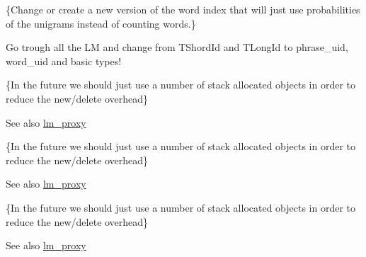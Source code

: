 \begin{DoxyRefList}
\item[\label{todo__todo000005}%
\hypertarget{todo__todo000005}{}%
Class \hyperlink{classuva_1_1smt_1_1bpbd_1_1server_1_1lm_1_1dictionary_1_1counting__word__index}{uva\+:\+:smt\+:\+:bpbd\+:\+:server\+:\+:lm\+:\+:dictionary\+:\+:counting\+\_\+word\+\_\+index} ]\{Change or create a new version of the word index that will just use probabilities of the unigrams instead of counting words.\}  
\item[\label{todo__todo000006}%
\hypertarget{todo__todo000006}{}%
Namespace \hyperlink{namespaceuva_1_1smt_1_1bpbd_1_1server_1_1lm_1_1identifiers}{uva\+:\+:smt\+:\+:bpbd\+:\+:server\+:\+:lm\+:\+:identifiers} ]Go trough all the L\+M and change from T\+Shord\+Id and T\+Long\+Id to phrase\+\_\+uid, word\+\_\+uid and basic types!  
\item[\label{todo__todo000007}%
\hypertarget{todo__todo000007}{}%
Member \hyperlink{classuva_1_1smt_1_1bpbd_1_1server_1_1lm_1_1proxy_1_1lm__proxy__local_ab2c1055d26c52e84e2171811662446ab}{uva\+:\+:smt\+:\+:bpbd\+:\+:server\+:\+:lm\+:\+:proxy\+:\+:lm\+\_\+proxy\+\_\+local\+:\+:allocate\+\_\+fast\+\_\+query\+\_\+proxy} ()]\{In the future we should just use a number of stack allocated objects in order to reduce the new/delete overhead\} \begin{DoxySeeAlso}{See also}
\hyperlink{classuva_1_1smt_1_1bpbd_1_1server_1_1lm_1_1proxy_1_1lm__proxy}{lm\+\_\+proxy}  
\end{DoxySeeAlso}

\item[\label{todo__todo000009}%
\hypertarget{todo__todo000009}{}%
Member \hyperlink{classuva_1_1smt_1_1bpbd_1_1server_1_1lm_1_1proxy_1_1lm__proxy__local_a95bc77c757872fbdbaa65f31a8bb3228}{uva\+:\+:smt\+:\+:bpbd\+:\+:server\+:\+:lm\+:\+:proxy\+:\+:lm\+\_\+proxy\+\_\+local\+:\+:allocate\+\_\+slow\+\_\+query\+\_\+proxy} ()]\{In the future we should just use a number of stack allocated objects in order to reduce the new/delete overhead\} \begin{DoxySeeAlso}{See also}
\hyperlink{classuva_1_1smt_1_1bpbd_1_1server_1_1lm_1_1proxy_1_1lm__proxy}{lm\+\_\+proxy}  
\end{DoxySeeAlso}

\item[\label{todo__todo000008}%
\hypertarget{todo__todo000008}{}%
Member \hyperlink{classuva_1_1smt_1_1bpbd_1_1server_1_1lm_1_1proxy_1_1lm__proxy__local_a1cc247ccdb00831f196d15cd9ab9eeaa}{uva\+:\+:smt\+:\+:bpbd\+:\+:server\+:\+:lm\+:\+:proxy\+:\+:lm\+\_\+proxy\+\_\+local\+:\+:dispose\+\_\+fast\+\_\+query\+\_\+proxy} (\hyperlink{classuva_1_1smt_1_1bpbd_1_1server_1_1lm_1_1proxy_1_1lm__fast__query__proxy}{lm\+\_\+fast\+\_\+query\+\_\+proxy} \&query)]\{In the future we should just use a number of stack allocated objects in order to reduce the new/delete overhead\} \begin{DoxySeeAlso}{See also}
\hyperlink{classuva_1_1smt_1_1bpbd_1_1server_1_1lm_1_1proxy_1_1lm__proxy}{lm\+\_\+proxy}  
\end{DoxySeeAlso}


\end{DoxyRefList}
